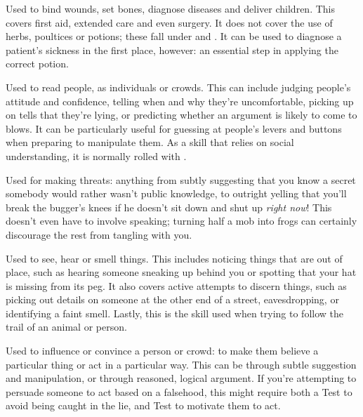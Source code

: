 
Used to bind wounds, set bones, diagnose diseases and deliver children.
This covers first aid, extended care and even surgery.
It does not cover the use of herbs, poultices or potions; these fall under  and .
It can be used to diagnose a patient's sickness in the first place, however: an essential step in applying the correct potion.


Used to read people, as individuals or crowds.
This can include judging people's attitude and confidence, telling when and why they're uncomfortable, picking up on tells that they're lying, or predicting whether an argument is likely to come to blows.
It can be particularly useful for guessing at people's levers and buttons when preparing to manipulate them.
As a skill that relies on social understanding, it is normally rolled with .


Used for making threats: anything from subtly suggesting that you know a secret somebody would rather wasn't public knowledge, to outright yelling that you'll break the bugger's knees if he doesn't sit down and shut up \emph{right now}!
This doesn't even have to involve speaking; turning half a mob into frogs can certainly discourage the rest from tangling with you.


Used to see, hear or smell things.
This includes noticing things that are out of place, such as hearing someone sneaking up behind you or spotting that your hat is missing from its peg.
It also covers active attempts to discern things, such as picking out details on someone at the other end of a street, eavesdropping, or identifying a faint smell.
Lastly, this is the skill used when trying to follow the trail of an animal or person.


Used to influence or convince a person or crowd: to make them believe a particular thing or act in a particular way.
This can be through subtle suggestion and manipulation, or through reasoned, logical argument.
If you're attempting to persuade someone to act based on a falsehood, this might require both a  Test to avoid being caught in the lie, and  Test to motivate them to act.


